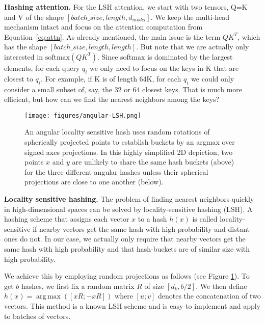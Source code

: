 \documentclass{article} \usepackage{iclr2020_conference,times}
\DeclareMathOperator*{\argmax}{arg\,max}
\renewcommand{\paragraph}[1]{\textbf{#1}}
\begin{document}
\paragraph{Hashing attention.}
For the LSH attention, we start with two tensors, Q=K and V
of the shape $[batch\_size, length, d_{model}]$.
We keep the multi-head mechanism intact and focus on the attention
computation from Equation~\ref{eq:attn}. As already mentioned,
the main issue is the term $QK^T$, which has the shape
$[batch\_size, length, length]$. But note that we are actually only
interested in $\mathrm{softmax}(QK^T)$. Since softmax is dominated
by the largest elements, for each query $q_i$ we only need to focus
on the keys in K that are closest to $q_i$. For example, if K is of
length 64K, for each $q_i$ we could only consider a small subset of,
say, the $32$ or $64$ closest keys. That is much more efficient, but how
can we find the nearest neighbors among the keys?

\begin{figure}
    \centering
    \texttt{[image: figures/angular-LSH.png]}
    \caption{An angular locality sensitive hash uses random rotations of spherically projected 
    points to establish buckets by an argmax over signed axes projections.  In this highly 
    simplified 2D depiction, two points $x$ and $y$ are unlikely to share the same hash buckets 
    (above) for the three different angular hashes unless their spherical projections are close 
    to one another (below).}
    \label{fig:lsh}
\end{figure}

\paragraph{Locality sensitive hashing.}
The problem of finding nearest neighbors quickly in high-dimensional spaces
can be solved by locality-sensitive hashing (LSH). A hashing scheme that assigns each
vector $x$ to a hash $h(x)$ is called locality-sensitive if nearby
vectors get the same hash with high probability and distant ones do not.
In our case, we actually only require that nearby vectors get the same
hash with high probability and that hash-buckets are of similar size with
high probability.

We achieve this by employing random projections as follows (see Figure \ref{fig:lsh}).
To get $b$ hashes, we first fix a random matrix $R$ of size $[d_k, b/2]$.
We then define $h(x) = \argmax([xR; -xR])$ where $[u; v]$ denotes the concatenation of two vectors.
This method is a known LSH scheme \citep{andoni2015angularLSH} and is easy to implement
and apply to batches of vectors.
\end{document}
